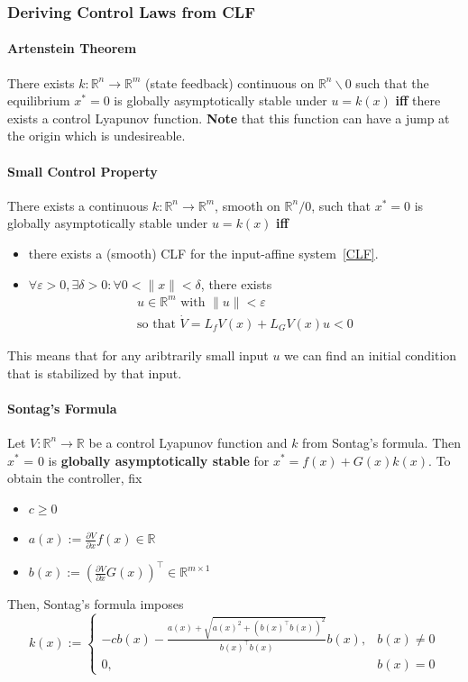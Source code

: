 \subsubsection{Deriving Control Laws from CLF}
\paragraph{Artenstein Theorem}
There exists $k : \mathbb{R}^n \to \mathbb{R}^m$ (state feedback) continuous on $\mathbb{R}^n \backslash {0}$ such that the equilibrium $x^* = 0$ is globally asymptotically stable under $u = k(x)$ \textbf{iff} there exists a control Lyapunov function.
\newpar{}
\textbf{Note} that this function can have a jump at the origin which is undesireable.
\paragraph{Small Control Property}
There exists a continuous $k:\mathbb{R}^n \to \mathbb{R}^m$, smooth on $\mathbb{R}^n / {0}$, such that $x^* = 0$ is globally asymptotically stable under $u = k(x)$ \textbf{iff}
\begin{itemize}
    \item there exists a (smooth) CLF for the input-affine system~\ref{CLF}.
    \item $\forall\varepsilon>0,\exists\delta>0: \forall 0<\|x\|<\delta$, there exists
          \begin{gather*}
              u\in\mathbb{R}^m\text{ with }\|u\|<\varepsilon\\
              \text{so that } \dot{V}=L_f V(x)+L_G V(x)u<0
          \end{gather*}
\end{itemize}
This means that for any aribtrarily small input $u$ we can find an initial condition that is stabilized by that input.
\paragraph{Sontag's Formula}
Let $V: \mathbb{R}^n \to \mathbb{R}$ be a control Lyapunov function and $k$ from Sontag's formula. Then $x^*$ = 0 is \textbf{globally asymptotically stable} for $x^*=f(x)+G(x)k(x)$.
\newpar{}
To obtain the controller, fix
\begin{itemize}
    \item $c\geq 0$
    \item $a(x):=\frac{\partial V}{\partial x}f(x)\in \mathbb{R}$
    \item $b(x):=\left(\frac{\partial V}{\partial x}G(x)\right)^\top\in \mathbb{R}^{m\times 1}$
\end{itemize}
Then, Sontag's formula imposes
\begin{equation*}
    k(x):=\begin{cases}
        -cb(x)-\frac{a(x)+\sqrt{{a(x)}^2+{({b(x)}^\top b(x))}^2}}{{b(x)}^\top b(x)}b(x), & b(x)\neq0 \\
        0,                                                                               & b(x)=0
    \end{cases}
\end{equation*}

